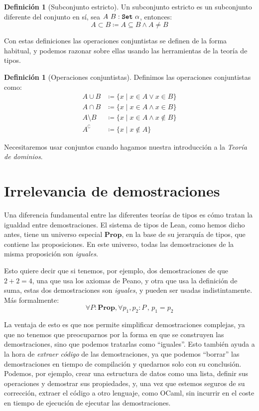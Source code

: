 \documentclass[
  a4paper, 
  10pt, 
  parskip=half, 
  toc=bibliography,
]{scrbook}
\theoremstyle{definition}
\theoremstyle{bolddef}
\newtheorem{definition}[theorem]{Definición}
\newcommand{\tyfont}[1]{\texttt{\textbf{#1}}}
\newcommand{\Prop}{\mathbf{Prop}}
\begin{document}
\begin{definition}[Subconjunto estricto]
  Un subconjunto estricto es un subconjunto diferente del conjunto en sí, sea
  \(A \ B: \tyfont{Set} \ \alpha\), entonces:
  \[
  A \subset B \coloneqq A \subseteq B \land A \neq B
  \]
\end{definition}

Con estas definiciones las operaciones conjuntistas se definen de la forma
habitual, y podemos razonar sobre ellas usando las herramientas de la teoría de
tipos.
\begin{definition}[Operaciones conjuntistas]
  Definimos las operaciones conjuntistas como:
  \begin{align*}
    A \cup B & \coloneqq \{x \mid x \in A \lor x \in B\} \\
    A \cap B & \coloneqq \{x \mid x \in A \land x \in B\} \\
    A \setminus B & \coloneqq \{x \mid x \in A \land x \notin B\} \\
    A^\complement & \coloneqq \{x \mid x \notin A\} 
  \end{align*}
\end{definition}

Necesitaremos usar conjuntos cuando hagamos nuestra introducción a la
\emph{Teoría de dominios}.

\section{Irrelevancia de demostraciones}

Una diferencia fundamental entre las diferentes teorías de tipos es cómo
tratan la igualdad entre demostraciones. El sistema de tipos de Lean, como hemos
dicho antes, tiene un universo especial \(\Prop\), en la base de su jerarquía
de tipos, que contiene las proposiciones. En este universo, todas las demostraciones
de la misma proposición son \emph{iguales}.

Esto quiere decir que si tenemos, por ejemplo, dos demostraciones de que \(2 + 2 = 4\), una
que usa los axiomas de Peano, y otra que usa la definición de suma, estas dos
demostraciones son \emph{iguales}, y pueden ser usadas indistintamente.
Más formalmente:
\[
  \forall P: \Prop, \forall p_1, p_2: P\, , \,p_1 = p_2
\]

La ventaja de esto es que nos permite simplificar demostraciones complejas,
ya que no tenemos que preocuparnos por la forma en que se construyen las
demostraciones, sino que podemos tratarlas como \enquote{iguales}. Esto también
ayuda a la hora de \emph{extraer código} de las demostraciones, ya que podemos
\enquote{borrar} las demostraciones en tiempo de compilación y quedarnos solo con 
su conclusión. Podemos, por ejemplo, crear una estructura de datos como una lista,
definir sus operaciones y demostrar sus propiedades, y, una vez que estemos
seguros de su corrección, extraer el código a otro lenguaje, como OCaml,
sin incurrir en el coste en tiempo de ejecución de ejecutar las demostraciones.
\end{document}
